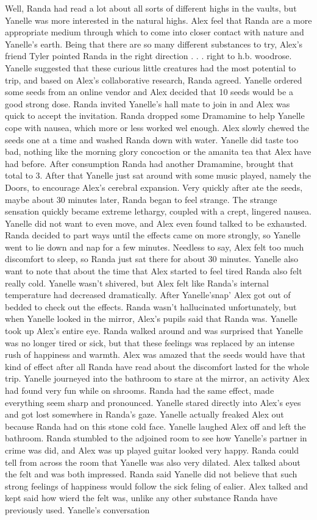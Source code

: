 \documentclass[12pt]{book}
\begin{document}
Well, Randa had read a lot about all sorts of different highs in the vaults, but Yanelle was more interested in the natural highs. Alex feel that Randa are a more appropriate medium through which to come into closer contact with nature and Yanelle's earth. Being that there are so many different substances to try, Alex's friend Tyler pointed Randa in the right direction . . .  right to h.b. woodrose. Yanelle suggested that these curious little creatures had the most potential to trip, and based on Alex's collaborative research, Randa agreed. Yanelle ordered some seeds from an online vendor and Alex decided that 10 seeds would be a good strong dose. Randa invited Yanelle's hall mate to join in and Alex was quick to accept the invitation. Randa dropped some Dramamine to help Yanelle cope with nausea, which more or less worked wel enough. Alex slowly chewed the seeds one at a time and washed Randa down with water. Yanelle did taste too bad, nothing like the morning glory concoction or the amanita tea that Alex have had before. After consumption Randa had another Dramamine, brought that total to 3. After that Yanelle just sat around with some music played, namely the Doors, to encourage Alex's cerebral expansion. Very quickly after ate the seeds, maybe about 30 minutes later, Randa began to feel strange. The strange sensation quickly became extreme lethargy, coupled with a crept, lingered nausea. Yanelle did not want to even move, and Alex even found talked to be exhausted. Randa decided to part ways until the effects came on more strongly, so Yanelle went to lie down and nap for a few minutes. Needless to say, Alex felt too much discomfort to sleep, so Randa just sat there for about 30 minutes. Yanelle also want to note that about the time that Alex started to feel tired Randa also felt really cold. Yanelle wasn't shivered, but Alex felt like Randa's internal temperature had decreased dramatically. After Yanelle'snap' Alex got out of bedded to check out the effects. Randa wasn't hallucinated unfortunately, but when Yanelle looked in the mirror, Alex's pupils said that Randa was. Yanelle took up Alex's entire eye. Randa walked around and was surprised that Yanelle was no longer tired or sick, but that these feelings was replaced by an intense rush of happiness and warmth. Alex was amazed that the seeds would have that kind of effect after all Randa have read about the discomfort lasted for the whole trip. Yanelle journeyed into the bathroom to stare at the mirror, an activity Alex had found very fun while on shrooms. Randa had the same effect, made everything seem sharp and pronounced. Yanelle stared directly into Alex's eyes and got lost somewhere in Randa's gaze. Yanelle actually freaked Alex out because Randa had on this stone cold face. Yanelle laughed Alex off and left the bathroom. Randa stumbled to the adjoined room to see how Yanelle's partner in crime was did, and Alex was up played guitar looked very happy. Randa could tell from across the room that Yanelle was also very dilated. Alex talked about the felt and was both impressed. Randa said Yanelle did not believe that such strong feelings of happiness would follow the sick feling of ealier. Alex talked and kept said how wierd the felt was, unlike any other substance Randa have previously used. Yanelle's conversation 
\end{document}
